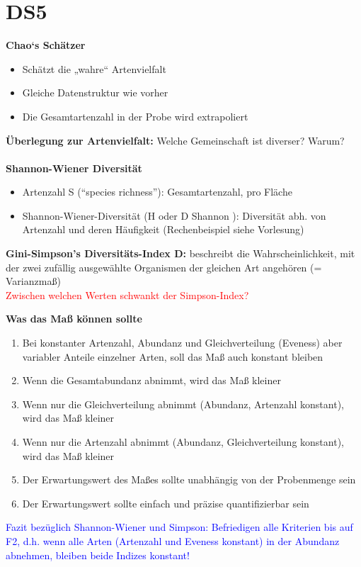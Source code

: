 \section{DS5}
\textbf{Chao‘s Schätzer}
\begin{itemize}
	\item Schätzt die „wahre“ Artenvielfalt
	\item Gleiche Datenstruktur wie vorher
	\item Die Gesamtartenzahl in der Probe wird extrapoliert
\end{itemize}

\textbf{Überlegung zur Artenvielfalt:} Welche Gemeinschaft ist diverser? Warum?
\\\\
\textbf{Shannon-Wiener Diversität}
\begin{itemize}
	\item Artenzahl S (“species richness”): Gesamtartenzahl, pro Fläche
	\item Shannon-Wiener-Diversität (H oder D Shannon ): Diversität abh. von Artenzahl und deren Häufigkeit (Rechenbeispiel siehe Vorlesung)
\end{itemize}

\textbf{Gini-Simpson's Diversitäts-Index D:} beschreibt die Wahrscheinlichkeit, mit der zwei zufällig ausgewählte Organismen der gleichen Art angehören (= Varianzmaß)\\
\textcolor{red}{Zwischen welchen Werten schwankt der Simpson-Index?}

\textbf{Was das Maß können sollte}
\begin{enumerate}
	\item Bei konstanter Artenzahl, Abundanz und Gleichverteilung (Eveness) aber variabler Anteile einzelner Arten, soll das Maß auch konstant bleiben
	\item Wenn die Gesamtabundanz abnimmt, wird das Maß kleiner
	\item Wenn nur die Gleichverteilung abnimmt (Abundanz, Artenzahl konstant), wird das Maß kleiner
	\item Wenn nur die Artenzahl abnimmt (Abundanz, Gleichverteilung konstant), wird das Maß kleiner
	\item Der Erwartungswert des Maßes sollte unabhängig von der Probenmenge sein
	\item Der Erwartungswert sollte einfach und präzise quantifizierbar sein
\end{enumerate}

\textcolor{blue}{Fazit bezüglich Shannon-Wiener und Simpson: Befriedigen alle Kriterien bis auf F2, d.h. wenn alle Arten (Artenzahl und Eveness konstant) in der Abundanz abnehmen, bleiben beide Indizes konstant!}

